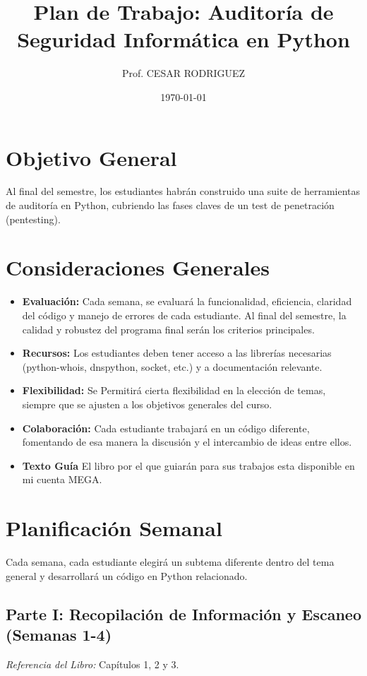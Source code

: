 \documentclass{article}
\title{Plan de Trabajo: Auditoría de Seguridad Informática en Python}
\author{Prof. CESAR RODRIGUEZ}
\date{\today}
\begin{document}
\maketitle

\section*{Objetivo General}
Al final del semestre, los estudiantes habrán construido una suite de herramientas de auditoría en Python, cubriendo las fases claves de un test de penetración (pentesting).

\section*{Consideraciones Generales}
\begin{itemize}
    \item \textbf{Evaluación:} Cada semana, se evaluará la funcionalidad, eficiencia, claridad del código y manejo de errores de cada estudiante. Al final del semestre, la calidad y robustez del programa final serán los criterios principales.
    \item \textbf{Recursos:} Los estudiantes deben tener acceso a las librerías necesarias (python-whois, dnspython, socket, etc.) y a documentación relevante.
    \item \textbf{Flexibilidad:} Se Permitirá cierta flexibilidad en la elección de temas, siempre que se ajusten a los objetivos generales del curso.
    \item \textbf{Colaboración:} Cada estudiante trabajará en un código diferente, fomentando de esa manera la discusión y el intercambio de ideas entre ellos.
    \item \textbf{Texto Guía} El libro por el que guiarán para sus trabajos esta disponible en mi cuenta MEGA.
\end{itemize}

\section*{Planificación Semanal}
Cada semana, cada estudiante elegirá un subtema diferente dentro del tema general y desarrollará un código en Python relacionado.

\subsection*{Parte I: Recopilación de Información y Escaneo (Semanas 1-4)}
\textit{Referencia del Libro:} Capítulos 1, 2 y 3.
\end{document}
